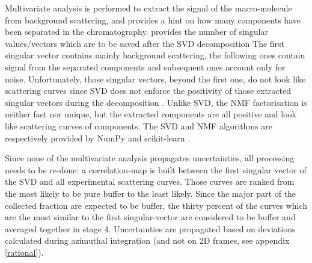 \documentclass[preprint]{iucr}              %
\begin{document}
Multivariate analysis is performed to extract the signal of the macro-molecule from background scattering, and provides a hint on how many components have been separated in the chromatography.
 provides the number of singular values/vectors which are to be saved after the SVD decomposition
The first singular vector contains mainly background scattering, the following ones contain signal from the separated components and subsequent ones account only for noise.
Unfortunately, those singular vectors, beyond the first one, do not look like scattering curves since SVD does not enforce the positivity of those extracted singular vectors during the decomposition \cite{NNMF_spectro}. 
Unlike SVD, the NMF factorisation is neither fast nor unique, but the extracted components are all positive and look like scattering curves of components. 
The SVD and NMF algorithms are respectively provided by NumPy \cite{numpy} and scikit-learn \cite{sklearn}.


Since none of the multivariate analysis propagates uncertainties, all processing needs to be re-done:
a correlation-map is built between the first singular vector of the SVD and all experimental scattering curves. 
Those curves are ranked from the most likely to be pure buffer to the least likely. 
Since the major part of the collected fraction are expected to be buffer, the thirty percent of the curves which are the most similar to the first singular-vector are considered to be buffer and averaged together in stage 4.
Uncertainties are propagated based on deviations calculated during azimuthal integration (and not on 2D frames, see appendix \ref{rational}).
\end{document}
